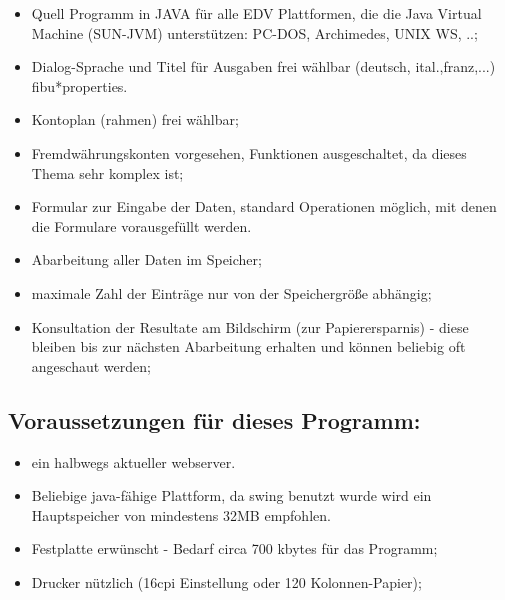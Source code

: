 \documentclass[12pt]{report}
\begin{document}
\begin{itemize}

\item  Quell Programm in JAVA für alle EDV Plattformen, die die Java Virtual
Machine (SUN-JVM) unterstützen: PC-DOS, Archimedes, UNIX WS, ..;

\item  Dialog-Sprache und Titel für Ausgaben frei wählbar (deutsch,
ital.,franz,...) fibu*properties.

\item  Kontoplan (rahmen) frei wählbar;

\item  Fremdwährungskonten vorgesehen, Funktionen ausgeschaltet, da dieses Thema sehr komplex ist;

\item  Formular zur Eingabe der Daten, standard Operationen möglich, mit denen die Formulare vorausgefüllt werden.

\item  Abarbeitung aller Daten im Speicher;

\item  maximale Zahl der Einträge nur von der Speichergröße abhängig;

\item  Konsultation der Resultate am Bildschirm (zur Papierersparnis) - diese
bleiben bis zur nächsten Abarbeitung erhalten und können beliebig oft
angeschaut werden;


\end{itemize}

\subsection{Voraussetzungen für dieses Programm:}

\begin{itemize}
\item ein halbwegs aktueller  webserver.
\item  Beliebige java-fähige Plattform, da swing benutzt wurde wird ein Hauptspeicher von mindestens 32MB empfohlen.

\item  Festplatte erwünscht - Bedarf circa 700 kbytes für das Programm;

\item  Drucker nützlich (16cpi Einstellung oder 120 Kolonnen-Papier);

\end{itemize}
\end{document}
